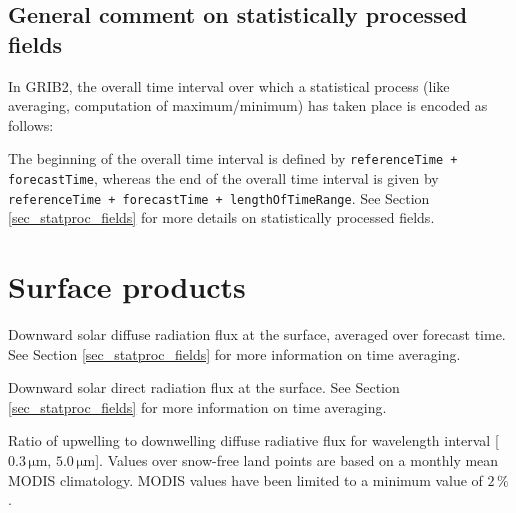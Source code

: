 \subsection{General comment on statistically processed fields}

In GRIB2, the overall time interval over which a statistical process (like averaging, computation of maximum/minimum) has taken place is 
encoded as follows:

The beginning of the overall time interval is defined by \texttt{referenceTime + forecastTime}, whereas the end of the 
overall time interval is given by \texttt{referenceTime + forecastTime + lengthOfTimeRange}. See Section 
\ref{sec_statproc_fields} for more details on statistically processed fields.




\section{Surface products}
\begin{description}[leftmargin=3.0cm,style=sameline]
 \item [ASWDIFD\_S] Downward solar diffuse radiation flux at the surface, averaged over forecast time. See Section 
                    \ref{sec_statproc_fields} for more information on time averaging. 
 
 \item [ASWDIR\_S] Downward solar direct radiation flux at the surface. See Section \ref{sec_statproc_fields} for more information 
                   on time averaging.
                   
 \item [ALB\_RAD] Ratio of upwelling to downwelling diffuse radiative flux for wavelength interval [$0.3\,\mathrm{\mu m},\,5.0\,\mathrm{\mu m}$]. 
                  Values over snow-free land points are based on a monthly mean MODIS climatology. MODIS values have been limited to a minimum value 
                  of $2\,\%$.  
\end{description}

